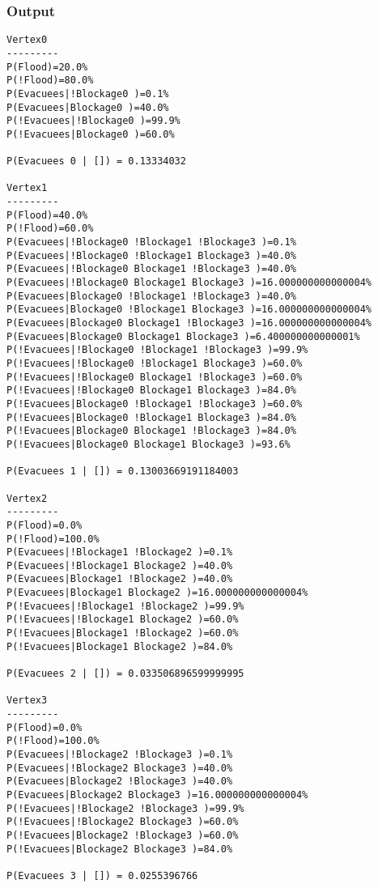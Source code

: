 \documentclass{article}                     %
\begin{document}
\subsubsection{Output}

\begin{verbatim}
Vertex0
---------
P(Flood)=20.0%
P(!Flood)=80.0%
P(Evacuees|!Blockage0 )=0.1%
P(Evacuees|Blockage0 )=40.0%
P(!Evacuees|!Blockage0 )=99.9%
P(!Evacuees|Blockage0 )=60.0%

P(Evacuees 0 | []) = 0.13334032

Vertex1
---------
P(Flood)=40.0%
P(!Flood)=60.0%
P(Evacuees|!Blockage0 !Blockage1 !Blockage3 )=0.1%
P(Evacuees|!Blockage0 !Blockage1 Blockage3 )=40.0%
P(Evacuees|!Blockage0 Blockage1 !Blockage3 )=40.0%
P(Evacuees|!Blockage0 Blockage1 Blockage3 )=16.000000000000004%
P(Evacuees|Blockage0 !Blockage1 !Blockage3 )=40.0%
P(Evacuees|Blockage0 !Blockage1 Blockage3 )=16.000000000000004%
P(Evacuees|Blockage0 Blockage1 !Blockage3 )=16.000000000000004%
P(Evacuees|Blockage0 Blockage1 Blockage3 )=6.400000000000001%
P(!Evacuees|!Blockage0 !Blockage1 !Blockage3 )=99.9%
P(!Evacuees|!Blockage0 !Blockage1 Blockage3 )=60.0%
P(!Evacuees|!Blockage0 Blockage1 !Blockage3 )=60.0%
P(!Evacuees|!Blockage0 Blockage1 Blockage3 )=84.0%
P(!Evacuees|Blockage0 !Blockage1 !Blockage3 )=60.0%
P(!Evacuees|Blockage0 !Blockage1 Blockage3 )=84.0%
P(!Evacuees|Blockage0 Blockage1 !Blockage3 )=84.0%
P(!Evacuees|Blockage0 Blockage1 Blockage3 )=93.6%

P(Evacuees 1 | []) = 0.13003669191184003

Vertex2
---------
P(Flood)=0.0%
P(!Flood)=100.0%
P(Evacuees|!Blockage1 !Blockage2 )=0.1%
P(Evacuees|!Blockage1 Blockage2 )=40.0%
P(Evacuees|Blockage1 !Blockage2 )=40.0%
P(Evacuees|Blockage1 Blockage2 )=16.000000000000004%
P(!Evacuees|!Blockage1 !Blockage2 )=99.9%
P(!Evacuees|!Blockage1 Blockage2 )=60.0%
P(!Evacuees|Blockage1 !Blockage2 )=60.0%
P(!Evacuees|Blockage1 Blockage2 )=84.0%

P(Evacuees 2 | []) = 0.033506896599999995

Vertex3
---------
P(Flood)=0.0%
P(!Flood)=100.0%
P(Evacuees|!Blockage2 !Blockage3 )=0.1%
P(Evacuees|!Blockage2 Blockage3 )=40.0%
P(Evacuees|Blockage2 !Blockage3 )=40.0%
P(Evacuees|Blockage2 Blockage3 )=16.000000000000004%
P(!Evacuees|!Blockage2 !Blockage3 )=99.9%
P(!Evacuees|!Blockage2 Blockage3 )=60.0%
P(!Evacuees|Blockage2 !Blockage3 )=60.0%
P(!Evacuees|Blockage2 Blockage3 )=84.0%

P(Evacuees 3 | []) = 0.0255396766


\end{verbatim}
\end{document}

